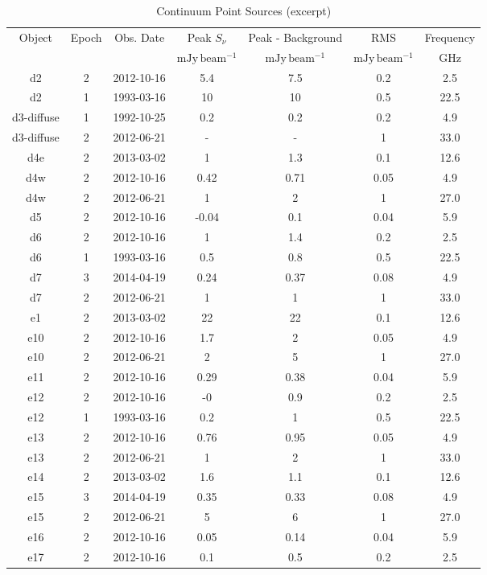 \begin{table*}[htp]
\caption{Continuum Point Sources (excerpt)}
\begin{tabular}{ccccccc}
\label{tab:contsrcs}
Object & Epoch & Obs. Date & Peak $S_{\nu}$ & Peak - Background & RMS & Frequency \\
 &  &  & $\mathrm{mJy\,beam^{-1}}$ & $\mathrm{mJy\,beam^{-1}}$ & $\mathrm{mJy\,beam^{-1}}$ & $\mathrm{GHz}$ \\
\hline
d2 & 2 & 2012-10-16 & 5.4 & 7.5 & 0.2 & 2.5 \\
d2 & 1 & 1993-03-16 & 10 & 10 & 0.5 & 22.5 \\
d3-diffuse & 1 & 1992-10-25 & 0.2 & 0.2 & 0.2 & 4.9 \\
d3-diffuse & 2 & 2012-06-21 & - & - & 1 & 33.0 \\
d4e & 2 & 2013-03-02 & 1 & 1.3 & 0.1 & 12.6 \\
d4w & 2 & 2012-10-16 & 0.42 & 0.71 & 0.05 & 4.9 \\
d4w & 2 & 2012-06-21 & 1 & 2 & 1 & 27.0 \\
d5 & 2 & 2012-10-16 & -0.04 & 0.1 & 0.04 & 5.9 \\
d6 & 2 & 2012-10-16 & 1 & 1.4 & 0.2 & 2.5 \\
d6 & 1 & 1993-03-16 & 0.5 & 0.8 & 0.5 & 22.5 \\
d7 & 3 & 2014-04-19 & 0.24 & 0.37 & 0.08 & 4.9 \\
d7 & 2 & 2012-06-21 & 1 & 1 & 1 & 33.0 \\
e1 & 2 & 2013-03-02 & 22 & 22 & 0.1 & 12.6 \\
e10 & 2 & 2012-10-16 & 1.7 & 2 & 0.05 & 4.9 \\
e10 & 2 & 2012-06-21 & 2 & 5 & 1 & 27.0 \\
e11 & 2 & 2012-10-16 & 0.29 & 0.38 & 0.04 & 5.9 \\
e12 & 2 & 2012-10-16 & -0 & 0.9 & 0.2 & 2.5 \\
e12 & 1 & 1993-03-16 & 0.2 & 1 & 0.5 & 22.5 \\
e13 & 2 & 2012-10-16 & 0.76 & 0.95 & 0.05 & 4.9 \\
e13 & 2 & 2012-06-21 & 1 & 2 & 1 & 33.0 \\
e14 & 2 & 2013-03-02 & 1.6 & 1.1 & 0.1 & 12.6 \\
e15 & 3 & 2014-04-19 & 0.35 & 0.33 & 0.08 & 4.9 \\
e15 & 2 & 2012-06-21 & 5 & 6 & 1 & 27.0 \\
e16 & 2 & 2012-10-16 & 0.05 & 0.14 & 0.04 & 5.9 \\
e17 & 2 & 2012-10-16 & 0.1 & 0.5 & 0.2 & 2.5 \\

\end{tabular}
\end{table*}
